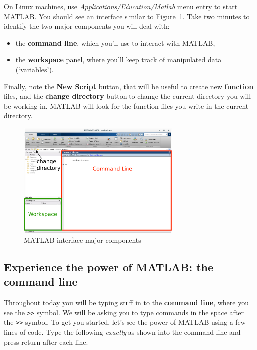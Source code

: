 \documentclass{article}
\begin{document}
On Linux machines, use \emph{Applications/Education/Matlab} menu entry to start MATLAB.
You should see an interface similar to Figure~\ref{fig:interface}.
Take two minutes to identify the two major components you will deal with:
\begin{itemize}
\item the \textbf{command line}, which you'll use to interact with MATLAB,
\item the \textbf{workspace} panel, where you'll keep track of manipulated data (`variables').
\end{itemize}

Finally, note the \textbf{New Script} button, that will be useful to create new \textbf{function} files, and the \textbf{change directory} button to change the current directory you will be working in.
MATLAB will look for the function files you write in the current directory.

\begin{figure}[h]
  \centering
  \includegraphics[width=0.7\textwidth]{figs/interface.pdf}
  \caption{MATLAB interface major components}\label{fig:interface}
\end{figure}


\pagebreak
\subsection*{Experience the power of MATLAB: the command line}

Throughout today you will be typing stuff in to the \textbf{command line}, where you see the \verb|>>| symbol.
We will be asking you to type commands in the space after the \verb|>>| symbol.
To get you started, let's see the power of MATLAB using a few lines of code.
Type the following \emph{exactly} as shown into the command line and press return after each line.
\end{document}
